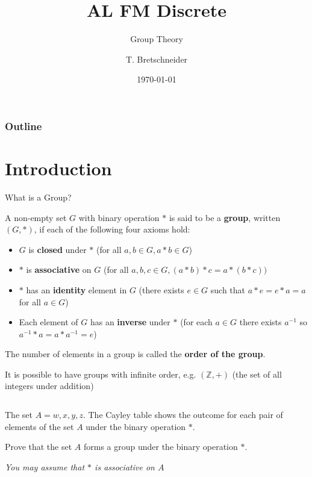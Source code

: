 \documentclass[8pt]{beamer}
\title[Discrete]{AL FM Discrete}
\subtitle{Group Theory}
\author[]{T. Bretschneider}
\date[\today]{\today}
\begin{document}
\frame{\titlepage}

\begin{frame}
\frametitle{Outline}
\tableofcontents

\end{frame}


\section{Introduction}

\begin{frame}[allowframebreaks]{What is a Group?}
	\begin{definition}
		A non-empty set $G$ with binary operation  $*$ is said to be a  \textbf{group}, written $(G,*)$, if each of the following four axioms hold:
		\begin{itemize}
			\item $G$ is  \textbf{closed} under  $*$ (for all  $a,b \in G, a*b \in G$)
			\item  $*$ is \textbf{associative} on  $G$  (for all $a,b,c\in G, (a*b)*c = a*(b*c))$ 
			\item $*$ has an \textbf{identity} element in  $G$ (there exists  $e \in G$ such that $a*e=e*a=a$ for all  $a\in G$)
			\item Each element of  $G$ has an  \textbf{inverse} under $*$ (for each  $a\in G$ there exists  $a^{-1}$ so  $a^{-1}*a=a*a^{-1}=e$)
		\end{itemize}
		
	\end{definition}
	
	\begin{definition}
	The number of elements in a group is called the \textbf{order of the group}. 
	\end{definition}

		It is possible to have groups with infinite order, e.g. $(\mathbb{Z},+)$ (the set of all integers under addition)
	\begin{columns}[T]
		
	\begin{column}{0.7\textwidth}
		\begin{Problem}
			The set $A={w,x,y,z}.$ The Cayley table shows the outcome for each pair of elements of the set  $A$ under the binary operation  $*$.

			Prove that the set  $A$ forms a group under the binary operation  $*$.

			 \emph{You may assume that $*$ is associative on $A$}
			

\end{Problem}
\end{column}
\end{columns}
\end{frame}
\end{document}
